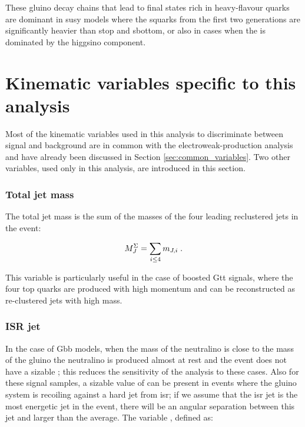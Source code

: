 These gluino decay chains that lead to final states rich in heavy-flavour quarks are dominant in \gls{susy} models where the squarks 
from the first two generations are significantly heavier than stop and sbottom, or also in cases when the \ninoone is dominated by the higgsino component. 


\section{Kinematic variables specific to this analysis}
\label{sec:variables-strong}

Most of the kinematic variables used in this analysis to discriminate between signal and background 
are in common with the electroweak-production analysis and have already been discussed in Section \ref{sec:common_variables}.
Two other variables, used only in this analysis, are introduced in this section.


\subsubsection*{Total jet mass}

The total jet mass is the sum of the masses of the four leading reclustered jets in the event:

\begin{equation}
M_{J}^{\Sigma} = \sum_{i \leq 4} m_{J,i} \; .
\end{equation}

\noindent This variable is particularly useful in the case of boosted Gtt signals, where the four top quarks are produced with high momentum and can be reconstructed as re-clustered jets with high mass. 

\subsubsection*{ISR jet}

In the case of Gbb models, when the mass of the neutralino is close to the mass of the gluino the neutralino is produced almost at rest and the event does not have a sizable \met; this reduces the sensitivity of the analysis to these cases. 
Also for these signal samples, a sizable value of \met can be present in events where the gluino system is recoiling against a hard jet from \gls{isr}; if we assume that the \gls{isr} jet is the most energetic jet in the event, there will be an angular separation between this jet and \met larger than the average. The variable \dphilead, defined as:

